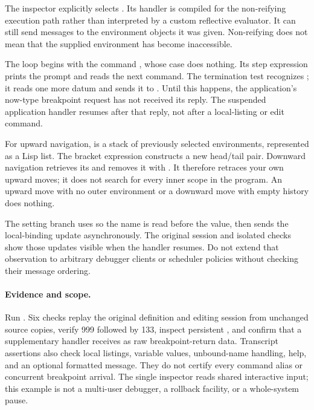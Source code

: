 The inspector explicitly selects . Its handler is
compiled for the non-reifying execution path rather than interpreted by a
custom reflective evaluator. It can still send messages to the environment
objects it was given. Non-reifying does not mean that the supplied
environment has become inaccessible.


The loop begins with the command , whose case does nothing.
Its step expression prints the prompt and reads the next command.
The termination test recognizes ; it reads one more datum and
sends it to . Until this happens, the application's now-type
breakpoint request has not received its reply. The suspended application
handler resumes after that reply, not after a local-listing or edit command.


For upward navigation,  is a stack of previously selected
environments, represented as a Lisp list. The bracket expression
 constructs a new head/tail pair.
Downward navigation retrieves its  and removes it with
. It therefore retraces your own upward moves; it does not
search for every inner scope in the program. An upward move with no outer
environment or a downward move with empty history does nothing.

The setting branch uses  so the name is read before the value,
then sends the local-binding update asynchronously. The original session
and isolated checks show those updates visible when the handler resumes.
Do not extend that observation to arbitrary debugger clients or scheduler
policies without checking their message ordering.

\paragraph{Evidence and scope.}
Run . Six checks replay the original
definition and editing session from unchanged source copies, verify
999 followed by 133, inspect persistent , and confirm that
a supplementary handler receives  as raw breakpoint-return
data. Transcript assertions also check local listings, variable values,
unbound-name handling, help, and an optional formatted message.
They do not certify every command alias or concurrent breakpoint arrival.
The single inspector reads shared interactive input; this example is not
a multi-user debugger, a rollback facility, or a whole-system pause.


